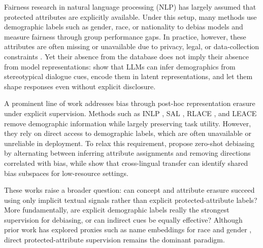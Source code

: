 \documentclass[11pt]{article}
\begin{document}
Fairness research in natural language processing (NLP) has largely assumed that protected attributes are explicitly available. Under this setup, many methods use demographic labels such as gender, race, or nationality to debias models and measure fairness through group performance gaps. In practice, however, these attributes are often missing or unavailable due to privacy, legal, or data-collection constraints \citep{ashurst2023withoutdemographics}. Yet their absence from the database does not imply their absence from model representations: \citet{neplenbroek2025personalization} show that LLMs can infer demographics from stereotypical dialogue cues, encode them in latent representations, and let them shape responses even without explicit disclosure.













A prominent line of work addresses bias through post-hoc representation erasure under explicit supervision. Methods such as INLP \citep{ravfogel-etal-2020-null}, SAL \citep{shao-etal-2022-SAL}, RLACE \citep{ravfogel22-LACE,shauli-2022-adversarial}, and LEACE \citep{nora-etal-leace} remove demographic information while largely preserving task utility. However, they rely on direct access to demographic labels, which are often unavailable or unreliable in deployment. To relax this requirement, \citet{shao2023erasure} propose zero-shot debiasing by alternating between inferring attribute assignments and removing directions correlated with bias, while \citet{shao-etal-2025-iterative} show that cross-lingual transfer can identify shared bias subspaces for low-resource settings.







These works raise a broader question: can concept and attribute erasure succeed using only implicit textual signals rather than explicit protected-attribute labels? More fundamentally, are explicit demographic labels really the strongest supervision for debiasing, or can indirect cues be equally effective? Although prior work has explored proxies such as name embeddings for race and gender \citep{romanov-etal-2019-whats}, direct protected-attribute supervision remains the dominant paradigm.
\end{document}
